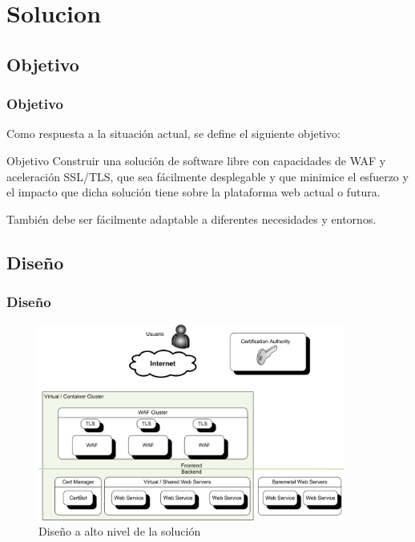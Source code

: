 \section{Solucion}
\subsection{Objetivo}
\begin{frame}[shrink]
  \frametitle{Objetivo}
  Como respuesta a la situación actual, se define el siguiente objetivo:
  \begin{block}{Objetivo}
    Construir una solución de software libre con capacidades de WAF y aceleración SSL/TLS, que sea  fácilmente desplegable y que minimice el esfuerzo y el impacto que dicha
    solución tiene sobre la plataforma web actual o futura.
    \par También debe ser fácilmente adaptable a diferentes necesidades y entornos.
  \end{block}
\end{frame}

\subsection{Diseño}
\begin{frame}[shrink]
  \frametitle{Diseño}
  \begin{figure}
    \includegraphics[width=0.9\textwidth]{fig/Diagram_HLD}
    \caption{\small{Diseño a alto nivel de la solución}}
  \end{figure}
\end{frame}

